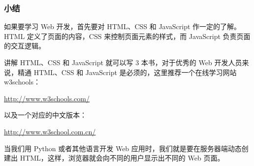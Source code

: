 \hypertarget{ux5c0fux7ed3}{%
\subsubsection{小结}\label{ux5c0fux7ed3}}

如果要学习 Web 开发，首先要对 HTML、CSS 和 JavaScript 作一定的了解。HTML
定义了页面的内容，CSS 来控制页面元素的样式，而 JavaScript
负责页面的交互逻辑。

讲解 HTML、CSS 和 JavaScript 就可以写 3 本书，对于优秀的 Web
开发人员来说，精通 HTML、CSS 和 JavaScript
是必须的，这里推荐一个在线学习网站 w3schools：

\url{http://www.w3schools.com/}

以及一个对应的中文版本：

\url{http://www.w3school.com.cn/}

当我们用 Python 或者其他语言开发 Web
应用时，我们就是要在服务器端动态创建出
HTML，这样，浏览器就会向不同的用户显示出不同的 Web 页面。

